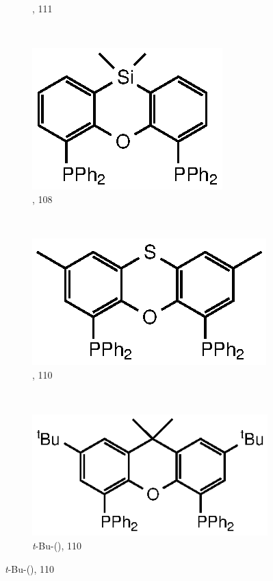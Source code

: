 \begin{figure}[htbp]
\begin{subfigure}[b]{0.35\textwidth}
	\caption{\Phxantphos, 111\degrees}
	\label{Phxantphos}
\end{subfigure}
~
\begin{subfigure}[b]{0.3\textwidth}
	\centering
	\includegraphics{../Figures/Xantphosderivatives/Sixantphos.eps}
	\caption{\Phsixantphos, 108\degrees}
	\label{Phsixantphos}
\end{subfigure}
~
\begin{subfigure}[b]{0.3\textwidth}
	\centering
	\includegraphics{../Figures/Xantphosderivatives/Phthixantphos.eps}
	\caption{\Phthixantphos, 110\degrees}
	\label{Phthixantphos}
\end{subfigure}
\\
\vspace{0.5cm}
\begin{subfigure}[b]{0.35\textwidth}
	\centering
	\includegraphics{../Figures/Xantphosderivatives/tBu-Phxantphos.eps}
	\caption{\emph{t}-Bu-(\Phxantphos), 110\degrees}
	\label{tBuPhxantphos}
\end{subfigure}

\end{figure}
